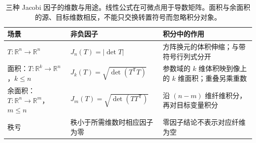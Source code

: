 \begin{table}[htbp]
\centering\small\renewcommand{\arraystretch}{1.18}\setlength{\tabcolsep}{4pt}
\caption[三种 Jacobi 因子的维数与用途]{三种 Jacobi 因子的维数与用途。线性公式在可微点用于导数矩阵。面积与余面积的源、目标维数相反，不能只交换转置符号而忽略积分对象。}
\label{b1:tab:visual-t10}
\begin{tabularx}{\linewidth}{@{}>{\raggedright\arraybackslash}p{3.1cm}>{\raggedright\arraybackslash}p{4.7cm}>{\raggedright\arraybackslash}X@{}}
\toprule
场景 & 非负因子 & 积分中的作用 \\
\midrule
\(T:\mathbb R^n\to\mathbb R^n\) & \(J_n(T)=|\det T|\) & 方阵换元的体积伸缩；与带符号行列式分开 \\
面积：\(T:\mathbb R^k\to\mathbb R^n\)，\(k\le n\) & \(J_k(T)=\sqrt{\det(T^{\mathsf T}T)}\) & 参数域的 \(k\) 维体积映到像上的 \(k\) 维面积；重叠另乘重数 \\
余面积：\(T:\mathbb R^n\to\mathbb R^m\)，\(m\le n\) & \(J_m(T)=\sqrt{\det(TT^{\mathsf T})}\) & 沿 \((n-m)\) 维纤维积分，再对目标变量积分 \\
秩亏 & 秩小于所需维数时相应因子为零 & 零因子结论不表示对应纤维为空 \\
\bottomrule
\end{tabularx}
\end{table}
